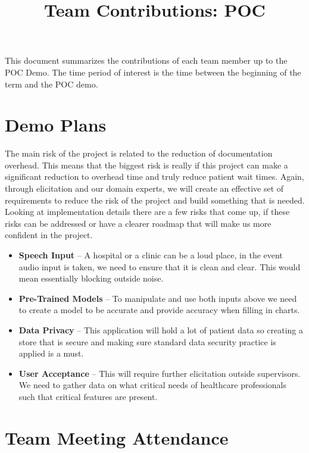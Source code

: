 \documentclass{article}
\title{Team Contributions: POC\\\progname}
\author{\authname}
\date{}
\begin{document}
\maketitle

This document summarizes the contributions of each team member up to the POC
Demo.  The time period of interest is the time between the beginning of the term
and the POC demo.

\section{Demo Plans}


The main risk of the project is related to the reduction of documentation overhead. This means that the biggest risk is really if this project can make a significant reduction to overhead time and truly reduce patient wait times. Again, through elicitation and our domain experts, we will create an effective set of requirements to reduce the risk of the project and build something that is needed.\\

Looking at implementation details there are a few risks that come up, if these risks can be addressed or have a clearer roadmap that will make us more confident in the project. 

\begin{itemize}
  \item \textbf{Speech Input} -- A hospital or a clinic can be a loud place, in the event audio input is taken, we need to ensure that it is clean and clear. This would mean essentially blocking outside noise.
  \item \textbf{Pre-Trained Models} -- To manipulate and use both inputs above we need to create a model to be accurate and provide accuracy when filling in charts. 
  \item \textbf{Data Privacy} -- This application will hold a lot of patient data so creating a store that is secure and making sure standard data security practice is applied is a must.
  \item \textbf{User Acceptance} -- This will require further elicitation outside supervisors. We need to gather data on what critical needs of healthcare professionals such that critical features are present. 
\end{itemize}

\section{Team Meeting Attendance}
\end{document}
